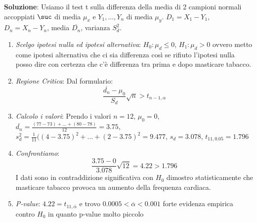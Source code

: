 \ind \textbf{Soluzione}: Usiamo il test t sulla differenza della media di 2 campioni normali accoppiati $\suc$ di media $\mu_x$ e $Y_1, ..., Y_n$ di media $\mu_y$. $D_1 = X_1 - Y_1$, $D_n = X_n - Y_n$, media $\overline{D_n}$, varianza $S_d^2$.
\begin{enumerate}
    \item \textit{Scelgo ipotesi nulla ed ipotesi alternativa}: $H_0: \mu_d \leq 0 $, $H_1: \mu_d > 0$ ovvero metto come ipotesi alternativa che ci sia differenza così se rifiuto l'ipotesi nulla posso dire con certezza che c'è differenza tra prima e dopo masticare tabacco.
    \item \textit{Regione Critica}: Dal formulario: $$ \dfrac{\overline{d_n} - \mu_0}{S_d}\sqrt{n} > t_{n-1, \alpha}$$ 
    \item \textit{Calcolo i valori}: Prendo i valori $n=12$, $\mu_0 = 0$, $\overline{d_n}= \frac{(77-73) + ... + (80 - 78)}{12}= 3.75$, $s_d^2 = \frac{1}{11}((4 - 3.75)^2 + ... + (2 - 3.75)^2 = 9.477$, $s_d = 3.078$, $t_{11, 0.05} = 1.796$
    \item \textit{Confrontiamo}: $$\dfrac{3.75 - 0}{3.078}\sqrt{12} = 4.22 > 1.796$$ I dati sono in contraddizione significativa con $H_0$ dimostro statisticamente che masticare tabacco provoca un aumento della frequenza cardiaca.
    \item \textit{P-value}: $4.22 = t_{11, \overline{\alpha}}$ e trovo $0.0005 < \overline{\alpha} < 0.001$ forte evidenza empirica contro $H_0$ in quanto p-value molto piccolo
\end{enumerate}
